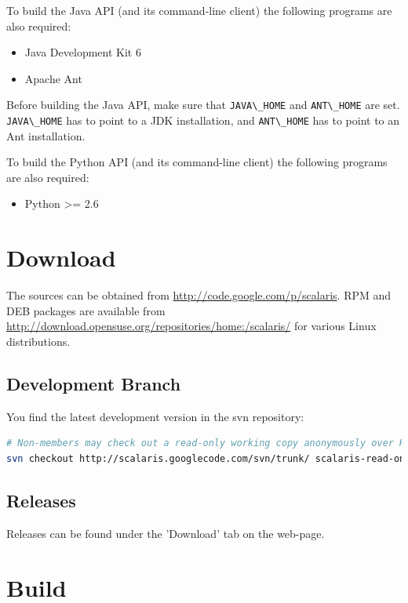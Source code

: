 \documentclass[a4paper]{scrreprt}
\newcommand{\code}[1]{\lstinline[basicstyle=\ttfamily]!#1!}
\begin{document}
To build the Java API (and its command-line client) the following
programs are also required:

\begin{itemize}
\setlength{\itemsep}{0pt}
\setlength{\parskip}{0pt}
\item Java Development Kit 6
\item Apache Ant
\end{itemize}

Before building the Java API, make sure that \code{JAVA\_HOME} and
\code{ANT\_HOME} are set. \code{JAVA\_HOME} has to point to a JDK
installation, and \code{ANT\_HOME} has to point to an Ant installation.

To build the Python API (and its command-line client) the following
programs are also required:

\begin{itemize}
\setlength{\itemsep}{0pt}
\setlength{\parskip}{0pt}
\item Python >= 2.6
\end{itemize}

\section{Download}

The sources can be obtained from
\url{http://code.google.com/p/scalaris}. RPM and DEB packages are available
from \url{http://download.opensuse.org/repositories/home:/scalaris/} for
various Linux distributions.

\subsection{Development Branch}

You find the latest development version in the svn repository:
\begin{lstlisting}[language=sh]
# Non-members may check out a read-only working copy anonymously over HTTP.
svn checkout http://scalaris.googlecode.com/svn/trunk/ scalaris-read-only
\end{lstlisting}

\subsection{Releases}

Releases can be found under the 'Download' tab on the web-page.


\section{Build}
\end{document}

